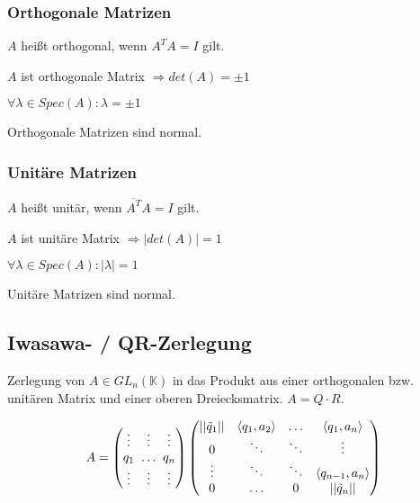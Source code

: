\subsubsection*{Orthogonale Matrizen}

$A$ heißt orthogonal, wenn $A^TA=I$ gilt.

$A$ ist orthogonale Matrix $\Rightarrow det(A)=\pm 1$

$\forall \lambda \in Spec(A) : \lambda=\pm 1$

Orthogonale Matrizen sind normal.

\subsubsection*{Unitäre Matrizen}

$A$ heißt unitär, wenn $\overline{A^T}A = I$ gilt.

$A$ ist unitäre Matrix $\Rightarrow |det(A)|=1$

$\forall \lambda \in Spec(A) : |\lambda| = 1$

Unitäre Matrizen sind normal.

\subsection*{Iwasawa- / QR-Zerlegung}

Zerlegung von $A \in GL_n(\mathbb{K})$ in das Produkt aus einer orthogonalen bzw. unitären Matrix und einer oberen Dreiecksmatrix. $A = Q \cdot R$.

\vspace*{-5mm}
$$A = \begin{pmatrix}
\vdots & \vdots                           & \vdots \\
q_1    & \hspace{-3mm}\hdots\hspace{-3mm} & q_n \\
\vdots & \vdots                           & \vdots
\end{pmatrix}
\begin{pmatrix}
||\tilde q_1|| & \langle q_1, a_2 \rangle & \hdots & \langle q_1, a_n \rangle \\
0              & \ddots                   & \ddots & \vdots \\
\vdots         & \ddots                   & \ddots & \langle q_{n-1}, a_n \rangle \\
0              & \hdots                   & 0      & ||\tilde q_n||
\end{pmatrix}$$

